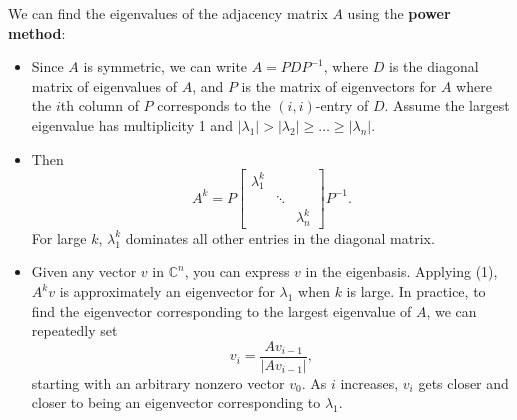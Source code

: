 \documentclass[12pt]{article}
\newcommand{\CC}{\mathbb{C}}
\theoremstyle{definition}
\begin{document}
We can find the eigenvalues of the adjacency matrix $A$ using the \textbf{power method}:
\begin{itemize}
	\item Since $A$ is symmetric, we can write $A = PDP^{-1}$, where $D$ is the diagonal matrix of eigenvalues of $A$, and $P$ is the matrix of eigenvectors for $A$ where the $i$th column of $P$ corresponds to the $(i, i)$-entry of $D$. Assume the largest eigenvalue has multiplicity 1 and $|\lambda_1| > |\lambda_2| \geq \dots \geq |\lambda_n|$.
	\item Then
	\begin{equation} A^k = P \begin{bmatrix} \lambda_1^k & & \\ & \ddots & \\ & & \lambda_n^k \end{bmatrix} P^{-1}. \end{equation}
	For large $k$, $\lambda_1^k$ dominates all other entries in the diagonal matrix.
	\item Given any vector $v$ in $\CC^n$, you can express $v$ in the eigenbasis. Applying (1), $A^k v$ is approximately an eigenvector for $\lambda_1$ when $k$ is large. In practice, to find the eigenvector corresponding to the largest eigenvalue of $A$, we can repeatedly set
	$$v_i = \frac{Av_{i-1}}{|Av_{i-1}|},$$
	starting with an arbitrary nonzero vector $v_0$. As $i$ increases, $v_i$ gets closer and closer to being an eigenvector corresponding to $\lambda_1$.
\end{itemize}
\end{document}
